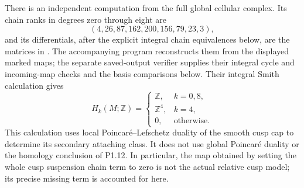 \begin{theorem}\label{night:P1.19}
There is an independent computation from the full global cellular
complex.  Its chain ranks in degrees zero through eight are
\[
 (4,26,87,162,200,156,79,23,3),
\]
and its differentials, after the explicit integral chain equivalences
below, are the matrices in
.
The accompanying program reconstructs them from the displayed marked
maps; the separate saved-output verifier supplies their integral
cycle and incoming-map checks and the basis comparisons below.
Their integral Smith calculation gives
\[
 H_k(M;\mathbb Z)=
 \begin{cases}
 \mathbb Z,&k=0,8,\\
 \mathbb Z^4,&k=4,\\
 0,&\text{otherwise}.
 \end{cases}
\]
This calculation uses local Poincar\'e--Lefschetz duality of the
smooth cusp cap to determine its secondary attaching class.  It does
not use global Poincar\'e duality or the homology conclusion of P1.12.
In particular, the map obtained by setting the whole cusp suspension
chain term to zero is not the actual relative cusp model; its precise
missing term is accounted for here.
\end{theorem}

